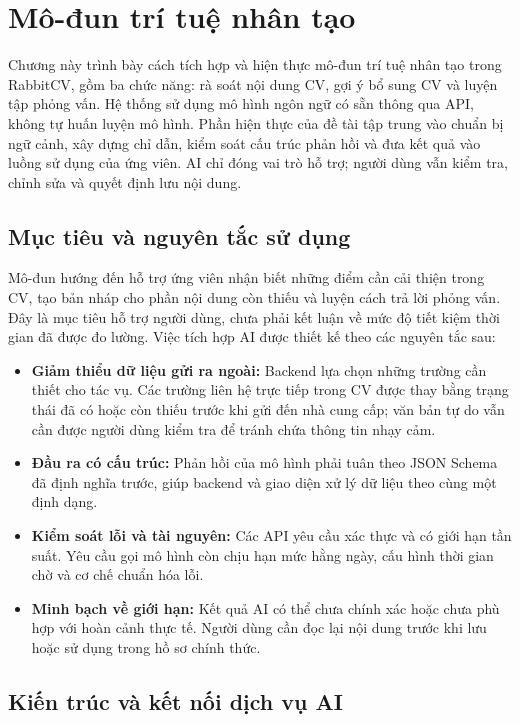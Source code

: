 \chapter{Mô-đun trí tuệ nhân tạo}
\label{chap:ai-module}

Chương này trình bày cách tích hợp và hiện thực mô-đun trí tuệ nhân tạo trong RabbitCV, gồm ba chức năng: rà soát nội dung CV, gợi ý bổ sung CV và luyện tập phỏng vấn. Hệ thống sử dụng mô hình ngôn ngữ có sẵn thông qua API, không tự huấn luyện mô hình. Phần hiện thực của đề tài tập trung vào chuẩn bị ngữ cảnh, xây dựng chỉ dẫn, kiểm soát cấu trúc phản hồi và đưa kết quả vào luồng sử dụng của ứng viên. AI chỉ đóng vai trò hỗ trợ; người dùng vẫn kiểm tra, chỉnh sửa và quyết định lưu nội dung.

\section{Mục tiêu và nguyên tắc sử dụng}

Mô-đun hướng đến hỗ trợ ứng viên nhận biết những điểm cần cải thiện trong CV, tạo bản nháp cho phần nội dung còn thiếu và luyện cách trả lời phỏng vấn. Đây là mục tiêu hỗ trợ người dùng, chưa phải kết luận về mức độ tiết kiệm thời gian đã được đo lường. Việc tích hợp AI được thiết kế theo các nguyên tắc sau:

\begin{itemize}
    \item \textbf{Giảm thiểu dữ liệu gửi ra ngoài:} Backend lựa chọn những trường cần thiết cho tác vụ. Các trường liên hệ trực tiếp trong CV được thay bằng trạng thái đã có hoặc còn thiếu trước khi gửi đến nhà cung cấp; văn bản tự do vẫn cần được người dùng kiểm tra để tránh chứa thông tin nhạy cảm.
    \item \textbf{Đầu ra có cấu trúc:} Phản hồi của mô hình phải tuân theo JSON Schema đã định nghĩa trước, giúp backend và giao diện xử lý dữ liệu theo cùng một định dạng.
    \item \textbf{Kiểm soát lỗi và tài nguyên:} Các API yêu cầu xác thực và có giới hạn tần suất. Yêu cầu gọi mô hình còn chịu hạn mức hằng ngày, cấu hình thời gian chờ và cơ chế chuẩn hóa lỗi.
    \item \textbf{Minh bạch về giới hạn:} Kết quả AI có thể chưa chính xác hoặc chưa phù hợp với hoàn cảnh thực tế. Người dùng cần đọc lại nội dung trước khi lưu hoặc sử dụng trong hồ sơ chính thức.
\end{itemize}

\section{Kiến trúc và kết nối dịch vụ AI}

